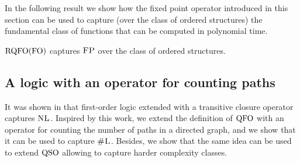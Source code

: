 In the following result we show how the fixed point operator introduced in this section can be used to capture (over the class of ordered structures) the fundamental class of functions that can be computed in polynomial time.
\begin{theorem} \label{rqfo-fo-cap}
	${\rm RQFO}({\rm FO})$ captures $\text{\sc FP}$ over the class of ordered structures.
\end{theorem}


%
%
%


\subsection{A logic with an operator for counting paths}

It was shown in \cite{I86,I88} that first-order logic extended with a transitive closure operator captures $\text{\sc NL}$. Inspired by this work, we extend the definition of ${\rm QFO}$ with an operator for counting the number of paths in a directed graph, and we show that it can be used to capture $\text{\sc \#L}$. Besides, we show that the same idea can be used to extend ${\rm QSO}$ allowing to capture harder complexity classes. 

